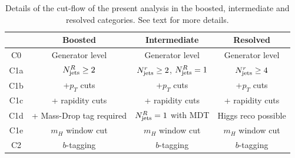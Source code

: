 \begin{table}[t]
  \centering
  \begin{tabular}{|c|c|c|c|}
\hline
&  Boosted  &   Intermediate &  Resolved  \\
\hline
\hline
C0 &  Generator level &  Generator level & Generator level \\
\hline
C1a & $N_{\rm jets}^{R}\ge 2$ & $N_{\rm jets}^{r}\ge 2$, $N_{\rm jets}^{R}=1$  &
 $N_{\rm jets}^{r}\ge 4$ \\
 C1b & +$p_T$ cuts & +$p_T$ cuts
 & +$p_T$ cuts \\
 C1c & + rapidity cuts &  + rapidity cuts &
 + rapidity cuts \\
 C1d & + Mass-Drop tag required & $N_{\rm jets}^{R}=1$ with MDT  &
  Higgs reco possible \\
C1e & $m_H$ window cut & $m_H$ window cut & $m_H$ window cut  \\
\hline
C2 & $b$-tagging  &  $b$-tagging &  $b$-tagging \\
\hline
  \end{tabular}
  \caption{\small Details of the cut-flow of the present analysis in the boosted, intermediate
    and resolved categories.
    See text for more details.
    \label{tab:cutflowdetails}
  }
\end{table}


